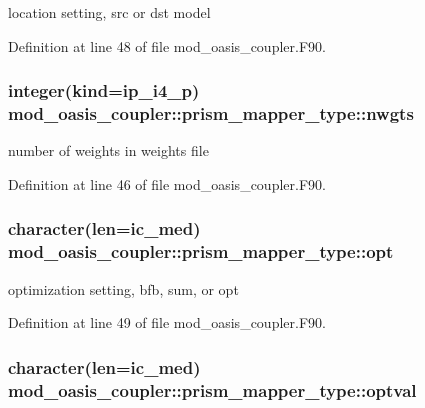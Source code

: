 location setting, src or dst model 



Definition at line 48 of file mod\+\_\+oasis\+\_\+coupler.\+F90.

\hypertarget{structmod__oasis__coupler_1_1prism__mapper__type_a8ea719b8aa4ce4bfed630471b4d3687a}{
\subsubsection[{nwgts}]{\setlength{\rightskip}{0pt plus 5cm}integer(kind=ip\+\_\+i4\+\_\+p) mod\+\_\+oasis\+\_\+coupler\+::prism\+\_\+mapper\+\_\+type\+::nwgts\hspace{0.3cm}{\ttfamily [private]}}}\label{structmod__oasis__coupler_1_1prism__mapper__type_a8ea719b8aa4ce4bfed630471b4d3687a}


number of weights in weights file 



Definition at line 46 of file mod\+\_\+oasis\+\_\+coupler.\+F90.

\hypertarget{structmod__oasis__coupler_1_1prism__mapper__type_aefa2ea5f38fd443b21f78911dfba3909}{
\subsubsection[{opt}]{\setlength{\rightskip}{0pt plus 5cm}character(len=ic\+\_\+med) mod\+\_\+oasis\+\_\+coupler\+::prism\+\_\+mapper\+\_\+type\+::opt\hspace{0.3cm}{\ttfamily [private]}}}\label{structmod__oasis__coupler_1_1prism__mapper__type_aefa2ea5f38fd443b21f78911dfba3909}


optimization setting, bfb, sum, or opt 



Definition at line 49 of file mod\+\_\+oasis\+\_\+coupler.\+F90.

\hypertarget{structmod__oasis__coupler_1_1prism__mapper__type_a14428f8875578a854dd33afbbfaabe57}{
\subsubsection[{optval}]{\setlength{\rightskip}{0pt plus 5cm}character(len=ic\+\_\+med) mod\+\_\+oasis\+\_\+coupler\+::prism\+\_\+mapper\+\_\+type\+::optval\hspace{0.3cm}{\ttfamily [private]}}}\label{structmod__oasis__coupler_1_1prism__mapper__type_a14428f8875578a854dd33afbbfaabe57}


